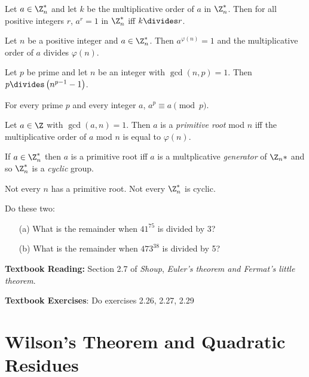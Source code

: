 \documentclass[oneside,12pt]{amsart}
\begin{document}
\begin{theorem}
Let $a\in\Z_n^*$ and let $k$ be the multiplicative order of $a$ in $\Z_n^*$. Then for all positive integers $r$, $a^r=1$ in $\Z^*_n$ iff $k\divides r$.
\end{theorem}

\begin{theorem}
Let $n$ be a positive integer and $a\in\Z_n^*$. Then $a^{\varphi(n)} = 1$ and the multiplicative order of $a$ divides $\varphi(n)$.
\end{theorem}

\begin{corollary}
Let $p$ be prime and let $n$ be an integer with $\gcd(n,p)=1$. Then $p\divides \left (n^{p-1} -1 \right)$.
\end{corollary}

\begin{theorem}
For every prime $p$ and every integer $a$, $a^p\equiv a \pmod p$.
\end{theorem}

\begin{definition}
Let $a\in\Z$ with $\gcd(a,n)=1$. Then $a$ is a \emph{primitive root} mod $n$ iff the multiplicative order of $a$ mod $n$ is equal to $\varphi(n)$.
\end{definition}

If $a\in\Z_n^*$ then $a$ is a primitive root iff $a$ is a multplicative \emph{generator} of $\Z_n*$ and so $\Z_n^*$ is a \emph{cyclic} group.

Not every $n$ has a primitive root. Not every $\Z_n^*$ is cyclic.

\begin{homework} Do these two:
\begin{itemize}
\item[(a)] What is the remainder when $41^{75}$ is divided by 3?
\item[(b)] What is the remainder when $473^{38}$ is divided by 5?
\end{itemize}

\end{homework}

\bigskip

\textbf{Textbook Reading:} Section 2.7 of \emph{Shoup}, \emph{Euler's theorem and Fermat's little theorem}.

\textbf{Textbook Exercises}: Do exercises 2.26, 2.27, 2.29

\newpage

\section{Wilson's Theorem and Quadratic Residues}
\end{document}
